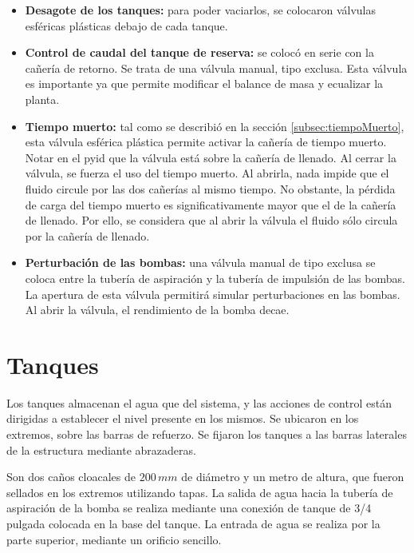 \begin{itemize}
  \item \textbf{Desagote de los tanques:}
  para poder vaciarlos, se colocaron válvulas esféricas plásticas debajo de
cada tanque.

  \item \textbf{Control de caudal del tanque de reserva:} se colocó en serie
con la cañería de retorno. Se trata de una válvula manual, tipo exclusa.
  Esta válvula es importante ya que permite modificar el balance de masa y
ecualizar la planta.

  \item \textbf{Tiempo muerto:}
  tal como se describió en la sección \ref{subsec:tiempoMuerto}, esta válvula
esférica plástica permite activar la cañería de tiempo muerto.
  Notar en el \gls{pyid} que la válvula está sobre la cañería de llenado.
  Al cerrar la válvula, se fuerza el uso del tiempo muerto.
  Al abrirla, nada impide que el fluido circule por las dos cañerías al mismo
tiempo.
  No obstante, la pérdida de carga del tiempo muerto es significativamente
mayor que el de la cañería de llenado.
  Por ello, se considera que al abrir la válvula  el fluido sólo circula
por la cañería de llenado.

  \item \textbf{Perturbación de las bombas:}
  una válvula manual de tipo exclusa se coloca entre la tubería de aspiración y
la tubería de impulsión de las bombas.
  La apertura de esta válvula permitirá simular perturbaciones en las
bombas.
 Al abrir la válvula, el rendimiento de la bomba decae.
 \end{itemize}

\section{Tanques}
\label{sec:Tanques}

Los tanques almacenan el agua que del sistema, y las acciones de
control están dirigidas a establecer el nivel presente en los mismos.
Se ubicaron en los extremos, sobre las barras de refuerzo.
Se fijaron los tanques a las barras laterales de la estructura mediante
abrazaderas.

Son dos caños cloacales de $200\,mm$ de diámetro y un metro de altura, que
fueron
sellados en los extremos utilizando tapas.
La salida de agua hacia la tubería de aspiración de la bomba se realiza
mediante una conexión de tanque de 3/4 pulgada colocada en la base del tanque.
La entrada de agua se realiza por la parte superior, mediante un orificio
sencillo.

